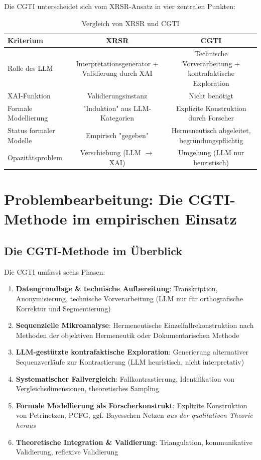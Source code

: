 \documentclass[12pt,a4paper]{article}
\begin{document}
Die CGTI unterscheidet sich vom XRSR-Ansatz in vier zentralen Punkten:

\begin{table}[H]
\centering
\caption{Vergleich von XRSR und CGTI}
\label{tab:vergleich}
\begin{tabular}{@{}lcc@{}}
\toprule
Kriterium & XRSR & CGTI \\ 
\midrule
Rolle des LLM & Interpretationsgenerator + Validierung durch XAI & Technische Vorverarbeitung + kontrafaktische Exploration \\
XAI-Funktion & Validierungsinstanz & Nicht benötigt \\
Formale Modellierung & "Induktion" aus LLM-Kategorien & Explizite Konstruktion durch Forscher \\
Status formaler Modelle & Empirisch "gegeben" & Hermeneutisch abgeleitet, begründungspflichtig \\
Opazitätsproblem & Verschiebung (LLM $\rightarrow$ XAI) & Umgehung (LLM nur heuristisch) \\
\bottomrule
\end{tabular}
\end{table}

\section{Problembearbeitung: Die CGTI-Methode im empirischen Einsatz}

\subsection{Die CGTI-Methode im Überblick}

Die CGTI umfasst sechs Phasen:

\begin{enumerate}
    \item \textbf{Datengrundlage \& technische Aufbereitung}: Transkription, Anonymisierung, technische Vorverarbeitung (LLM nur für orthografische Korrektur und Segmentierung)
    \item \textbf{Sequenzielle Mikroanalyse}: Hermeneutische Einzelfallrekonstruktion nach Methoden der objektiven Hermeneutik oder Dokumentarischen Methode
    \item \textbf{LLM-gestützte kontrafaktische Exploration}: Generierung alternativer Sequenzverläufe zur Kontrastierung (LLM heuristisch, nicht interpretativ)
    \item \textbf{Systematischer Fallvergleich}: Fallkontrastierung, Identifikation von Vergleichsdimensionen, theoretisches Sampling
    \item \textbf{Formale Modellierung als Forscherkonstrukt}: Explizite Konstruktion von Petrinetzen, PCFG, ggf. Bayesschen Netzen \textit{aus der qualitativen Theorie heraus}
    \item \textbf{Theoretische Integration \& Validierung}: Triangulation, kommunikative Validierung, reflexive Validierung
\end{enumerate}
\end{document}
